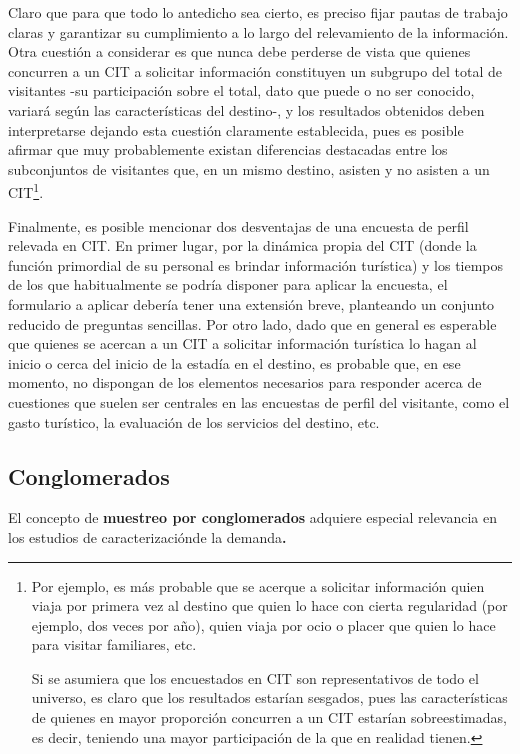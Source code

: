 \documentclass[
]{book}
\begin{document}
Claro que para que todo lo antedicho sea cierto, es preciso fijar pautas de trabajo claras y garantizar su cumplimiento a lo largo del relevamiento de la información. Otra cuestión a considerar es que nunca debe perderse de vista que quienes concurren a un CIT a solicitar información constituyen un subgrupo del total de visitantes -su participación sobre el total, dato que puede o no ser conocido, variará según las características del destino-, y los resultados obtenidos deben interpretarse dejando esta cuestión claramente establecida, pues es posible afirmar que muy probablemente existan diferencias destacadas entre los subconjuntos de visitantes que, en un mismo destino, asisten y no asisten a un CIT\footnote{Por ejemplo, es más probable que se acerque a solicitar información quien viaja por primera vez al destino que quien lo hace con cierta regularidad (por ejemplo, dos veces por año), quien viaja por ocio o placer que quien lo hace para visitar familiares, etc.

  Si se asumiera que los encuestados en CIT son representativos de todo el universo, es claro que los resultados estarían sesgados, pues las características de quienes en mayor proporción concurren a un CIT estarían sobreestimadas, es decir, teniendo una mayor participación de la que en realidad tienen.}.

Finalmente, es posible mencionar dos desventajas de una encuesta de perfil relevada en CIT. En primer lugar, por la dinámica propia del CIT (donde la función primordial de su personal es brindar información turística) y los tiempos de los que habitualmente se podría disponer para aplicar la encuesta, el formulario a aplicar debería tener una extensión breve, planteando un conjunto reducido de preguntas sencillas. Por otro lado, dado que en general es esperable que quienes se acercan a un CIT a solicitar información turística lo hagan al inicio o cerca del inicio de la estadía en el destino, es probable que, en ese momento, no dispongan de los elementos necesarios para responder acerca de cuestiones que suelen ser centrales en las encuestas de perfil del visitante, como el gasto turístico, la evaluación de los servicios del destino, etc.

\hypertarget{conglomerados}{%
\subsection{Conglomerados}\label{conglomerados}}

El concepto de \textbf{muestreo por conglomerados} adquiere especial relevancia en los estudios de caracterizaciónde la demanda\textbf{.}
\end{document}
